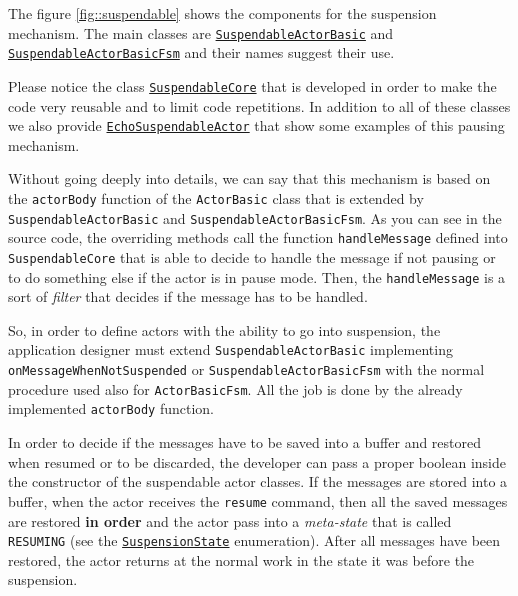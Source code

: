 The figure \ref{fig::suspendable} shows the components for the suspension mechanism.
The main classes are \href{https://github.com/LM-96/QA-Extensions/blob/main/it.unibo.qakactor/src/main/kotlin/SuspendableActorBasic.kt}{\texttt{SuspendableActorBasic}} and \href{https://github.com/LM-96/QA-Extensions/blob/main/it.unibo.qakactor/src/main/kotlin/SuspendableActorBasicFsm.kt}{\texttt{SuspendableActorBasicFsm}} and their names suggest their use.

Please notice the class \href{https://github.com/LM-96/QA-Extensions/blob/main/it.unibo.qakactor/src/main/kotlin/SuspendableCore.kt}{\texttt{SuspendableCore}} that is developed in order to make the code very reusable and to limit code repetitions. In addition to all of these classes we also provide \href{https://github.com/LM-96/QA-Extensions/blob/main/it.unibo.qakactor/src/main/kotlin/demo/EchoSuspendableActor.kt}{\texttt{EchoSuspendableActor}} that show some examples of this pausing mechanism.

Without going deeply into details, we can say that this mechanism is based on the \texttt{actorBody} function of the \texttt{ActorBasic} class that is extended by \texttt{SuspendableActorBasic} and \texttt{SuspendableActorBasicFsm}. As you can see in the source code, the overriding methods call the function \texttt{handleMessage} defined into \texttt{SuspendableCore} that is able to decide to handle the message if not pausing or to do something else if the actor is in pause mode. Then, the \texttt{handleMessage} is a sort of \textit{filter} that decides if the message has to be handled.

So, in order to define actors with the ability to go into suspension, the application designer must extend \texttt{SuspendableActorBasic} implementing \texttt{onMessageWhenNotSuspended} or \texttt{SuspendableActorBasicFsm} with the normal procedure used also for \texttt{ActorBasicFsm}. All the job is done by the already implemented \texttt{actorBody} function.

In order to decide if the messages have to be saved into a buffer and restored when resumed or to be discarded, the developer can pass a proper boolean inside the constructor of the suspendable actor classes.
If the messages are stored into a buffer, when the actor receives the \texttt{resume} command, then all the saved messages are restored \textbf{in order} and the actor pass into a \textit{meta-state} that is called \texttt{RESUMING} (see the \texttt{\href{https://github.com/LM-96/QA-Extensions/blob/main/it.unibo.qakactor/src/main/kotlin/SuspendableCore.kt}{\texttt{SuspensionState}}} enumeration). After all messages have been restored, the actor returns at the normal work in the state it was before the suspension.

